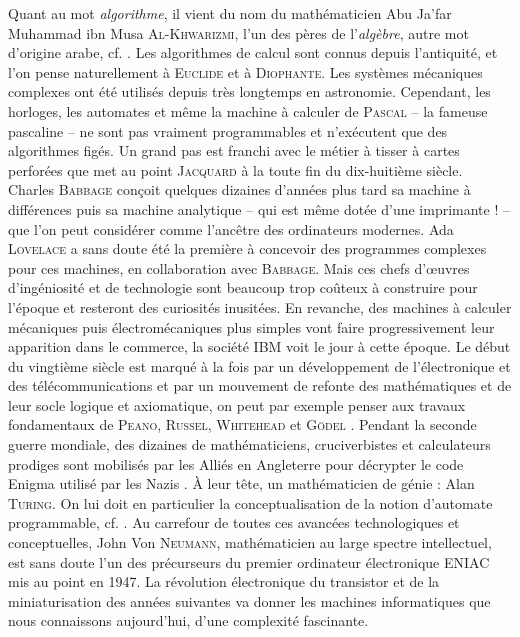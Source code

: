{{Quant au mot \emph{algorithme}, il vient du nom du mathématicien Abu Ja'far
Muhammad ibn Musa \textsc{Al-Khwarizmi}, l'un des pères de l'\emph{algèbre},
autre mot d'origine arabe, cf. \cite{djebbar}.  Les algorithmes de calcul sont
connus depuis l'antiquité, et l'on pense naturellement à \textsc{Euclide} et à
\textsc{Diophante}. Les systèmes mécaniques complexes ont été utilisés depuis
très longtemps en astronomie. Cependant, les horloges, les automates et même
la machine à calculer de \textsc{Pascal} -- la fameuse pascaline -- ne sont
pas vraiment programmables et n'exécutent que des algorithmes figés. Un grand
pas est franchi avec le métier à tisser à cartes perforées que met au point
\textsc{Jacquard} à la toute fin du dix-huitième siècle. Charles
\textsc{Babbage} conçoit quelques dizaines d'années plus tard sa machine à
différences puis sa machine analytique -- qui est même dotée d'une imprimante
! -- que l'on peut considérer comme l'ancêtre des ordinateurs modernes. Ada
\textsc{Lovelace} a sans doute été la première à concevoir des programmes
complexes pour ces machines, en collaboration avec \textsc{Babbage}.  Mais ces
chefs d'{\oe}uvres d'ingéniosité et de technologie sont beaucoup trop coûteux
à construire pour l'époque et resteront des curiosités inusitées. En revanche,
des machines à calculer mécaniques puis électromécaniques plus simples vont
faire progressivement leur apparition dans le commerce, la société IBM voit le
jour à cette époque. Le début du vingtième siècle est marqué à la fois par un
développement de l'électronique et des télécommunications et par un mouvement
de refonte des mathématiques et de leur socle logique et axiomatique, on peut
par exemple penser aux travaux fondamentaux de \textsc{Peano},
\textsc{Russel}, \textsc{Whitehead} et \textsc{Gödel}
\cite{nagel-newman-godel-girard}. Pendant la seconde guerre mondiale, des
dizaines de mathématiciens, cruciverbistes et calculateurs prodiges sont
mobilisés par les Alliés en Angleterre pour décrypter le code Enigma utilisé
par les Nazis \cite{singh}. À leur tête, un mathématicien de génie : Alan
\textsc{Turing}. On lui doit en particulier la conceptualisation de la notion
d'automate programmable, cf. \cite{turing-girard}.  Au carrefour de toutes ces
avancées technologiques et conceptuelles, John Von \textsc{Neumann},
mathématicien au large spectre intellectuel, est sans doute l'un des
précurseurs du premier ordinateur électronique ENIAC mis au point en 1947. La
révolution électronique du transistor et de la miniaturisation des années
suivantes va donner les machines informatiques que nous connaissons
aujourd'hui, d'une complexité fascinante.

}}

